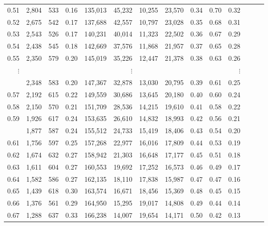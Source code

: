 \begin{tabular}{rrrrrrrrrrrrrr}
0.51 &  2,804 &  533 &  0.16 &  135,013 &   45,232 &  10,255 &  23,570 &  0.34 &  0.70 &      0.32 \\
0.52 &  2,675 &  542 &  0.17 &  137,688 &   42,557 &  10,797 &  23,028 &  0.35 &  0.68 &      0.31 \\
0.53 &  2,543 &  526 &  0.17 &  140,231 &   40,014 &  11,323 &  22,502 &  0.36 &  0.67 &      0.29 \\
0.54 &  2,438 &  545 &  0.18 &  142,669 &   37,576 &  11,868 &  21,957 &  0.37 &  0.65 &      0.28 \\
0.55 &  2,350 &  579 &  0.20 &  145,019 &   35,226 &  12,447 &  21,378 &  0.38 &  0.63 &      0.26 \\
$\vdots$ &&&&& $\vdots$ &&&&& $\vdots$ \\
\begin{comment}
0.56 &  2,348 &  583 &  0.20 &  147,367 &   32,878 &  13,030 &  20,795 &  0.39 &  0.61 &      0.25 \\
0.57 &  2,192 &  615 &  0.22 &  149,559 &   30,686 &  13,645 &  20,180 &  0.40 &  0.60 &      0.24 \\
0.58 &  2,150 &  570 &  0.21 &  151,709 &   28,536 &  14,215 &  19,610 &  0.41 &  0.58 &      0.22 \\
0.59 &  1,926 &  617 &  0.24 &  153,635 &   26,610 &  14,832 &  18,993 &  0.42 &  0.56 &      0.21 \\
\end{comment}
0.60 &  1,877 &  587 &  0.24 &  155,512 &   24,733 &  15,419 &  18,406 &  0.43 &  0.54 &      0.20 \\
0.61 &  1,756 &  597 &  0.25 &  157,268 &   22,977 &  16,016 &  17,809 &  0.44 &  0.53 &      0.19 \\
0.62 &  1,674 &  632 &  0.27 &  158,942 &   21,303 &  16,648 &  17,177 &  0.45 &  0.51 &      0.18 \\
0.63 &  1,611 &  604 &  0.27 &  160,553 &   19,692 &  17,252 &  16,573 &  0.46 &  0.49 &      0.17 \\
0.64 &  1,582 &  586 &  0.27 &  162,135 &   18,110 &  17,838 &  15,987 &  0.47 &  0.47 &      0.16 \\
0.65 &  1,439 &  618 &  0.30 &  163,574 &   16,671 &  18,456 &  15,369 &  0.48 &  0.45 &      0.15 \\
0.66 &  1,376 &  561 &  0.29 &  164,950 &   15,295 &  19,017 &  14,808 &  0.49 &  0.44 &      0.14 \\
0.67 &  1,288 &  637 &  0.33 &  166,238 &   14,007 &  19,654 &  14,171 &  0.50 &  0.42 &      0.13 \\

\end{tabular}
